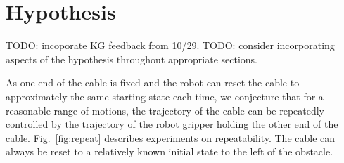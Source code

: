 \section{Hypothesis}

{\color{red} TODO: incoporate KG feedback from 10/29.  TODO: consider incorporating aspects of the hypothesis throughout appropriate sections.}

As one end of the cable is fixed and the robot can reset the cable to approximately the same starting state each time, we conjecture that for a reasonable range of motions, the trajectory of the cable can be repeatedly controlled by the trajectory of the robot gripper holding the other end of the cable. Fig.~\ref{fig:repeat} describes experiments on repeatability. The cable can always be reset to a relatively known initial state to the left of the obstacle. %

